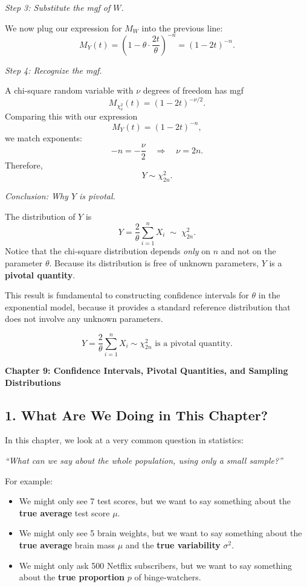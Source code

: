 \documentclass[11pt,letterpaper]{article}
\theoremstyle{remark}
\begin{document}
\medskip
\textit{Step 3: Substitute the mgf of $W$.}

We now plug our expression for $M_W$ into the previous line:
\[
M_Y(t)
= \left(1 - \theta \cdot \frac{2t}{\theta}\right)^{-n}
= (1 - 2t)^{-n}.
\]

\medskip
\textit{Step 4: Recognize the mgf.}

A chi-square random variable with $\nu$ degrees of freedom has mgf
\[
M_{\chi^2_\nu}(t)
= (1 - 2t)^{-\nu/2}.
\]
Comparing this with our expression
\[
M_Y(t) = (1 - 2t)^{-n},
\]
we match exponents:
\[
-n = -\frac{\nu}{2}
\quad\Longrightarrow\quad
\nu = 2n.
\]
Therefore,
\[
Y \sim \chi^2_{2n}.
\]

\medskip
\textit{Conclusion: Why $Y$ is pivotal.}

The distribution of $Y$ is
\[
Y = \frac{2}{\theta}\sum_{i=1}^n X_i \;\sim\; \chi^2_{2n}.
\]
Notice that the chi-square distribution depends \emph{only} on $n$ and not on
the parameter $\theta$. Because its distribution is free of unknown parameters,
$Y$ is a \textbf{pivotal quantity}.

This result is fundamental to constructing confidence intervals for $\theta$ in
the exponential model, because it provides a standard reference distribution
that does not involve any unknown parameters.

\[
\boxed{Y = \frac{2}{\theta}\sum_{i=1}^n X_i \sim \chi^2_{2n} \text{ is a pivotal quantity.}}
\]

\newpage

\textbf{Chapter 9: Confidence Intervals, Pivotal Quantities, and Sampling Distributions}

\vspace{0.5cm}

\subsection*{1. What Are We Doing in This Chapter?}

In this chapter, we look at a very common question in statistics:

\begin{center}
\emph{``What can we say about the whole population, using only a small sample?''}
\end{center}

For example:
\begin{itemize}
    \item We might only see 7 test scores, but we want to say something about the \textbf{true average} test score $\mu$.
    \item We might only see 5 brain weights, but we want to say something about the \textbf{true average} brain mass $\mu$ and the \textbf{true variability} $\sigma^2$.
    \item We might only ask 500 Netflix subscribers, but we want to say something about the \textbf{true proportion} $p$ of binge-watchers.
\end{itemize}
\end{document}
